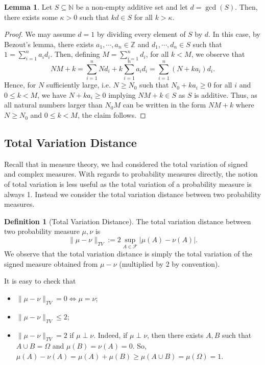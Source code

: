 \documentclass[]{article}
\theoremstyle{definition}
\theoremstyle{definition}
\newtheorem{definition}{Definition}[section]
\newtheorem{lemma}{Lemma}[section]
\begin{document}
\begin{lemma}
  Let \(S \subseteq \mathbb{N}\) be a non-empty additive set and let \(d = \gcd(S)\).
  Then, there exists some \(\kappa > 0\) such that \(kd \in S\) for all \(k > \kappa\).
\end{lemma}
\begin{proof}
  We may assume \(d = 1\) by dividing every element of \(S\) by \(d\). In this 
  case, by Bezout's lemma, there exists \(a_1, \cdots, a_n \in \mathbb{Z}\) 
  and \(d_1, \cdots, d_n \in S\) such that \(1 = \sum_{i = 1}^n a_i d_i\). 
  Then, defining \(M = \sum_{i = 1}^n d_i\), for all \(k < M\), we observe 
  that 
  \[NM + k = \sum_{i = 1}^n Nd_i + k \sum_{i = 1}^n a_i d_i = \sum_{i = 1}^n(N + ka_i)d_i.\]
  Hence, for \(N\) sufficiently large, i.e. \(N \ge N_0\) such that 
  \(N_0 + ka_i \ge 0\) for all \(i\) and \(0 \le k < M\), we have 
  \(N + ka_i \ge 0\) implying \(NM + k \in S\) as \(S\) is additive. 
  Thus, as all natural numbers larger than \(N_0M\) can be written in the form 
  \(NM + k\) where \(N \ge N_0\) and \(0 \le k < M\), the claim follows.
\end{proof}

\subsection{Total Variation Distance}

Recall that in measure theory, we had considered the total variation of signed 
and complex measures. With regards to probability measures directly, the notion 
of total variation is less useful as the total variation of a probability measure 
is always 1. Instead we consider the total variation distance between two 
probability measures.

\begin{definition}[Total Variation Distance]
  The total variation distance between two probability measure \(\mu, \nu\) is 
  \[\|\mu - \nu\|_{TV} := 2\sup_{A \in \mathcal{F}} |\mu(A) - \nu(A)|.\]
  We observe that the total variation distance is simply the total variation of 
  the signed measure obtained from \(\mu - \nu\) (multiplied by 2 by convention).
\end{definition}

It is easy to check that 
\begin{itemize}
  \item \(\|\mu - \nu\|_{TV} = 0 \iff \mu = \nu\);
  \item \(\|\mu - \nu\|_{TV} \le 2\);
  \item \(\|\mu - \nu\|_{TV} = 2\) if \(\mu \perp \nu\). Indeed, if \(\mu \perp \nu\), 
    then there exists \(A, B\) such that \(A \cup B = \Omega\) and 
    \(\mu(B) = \nu(A) = 0\). So, \(\mu(A) - \nu(A) = \mu(A) + \mu(B) \ge 
      \mu(A \cup B) = \mu(\Omega) = 1\).
\end{itemize}
\end{document}
